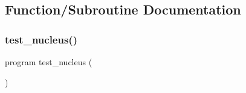 \subsection{Function/\+Subroutine Documentation}
\mbox{\label{table__mod_8f90_a8ebb53a70bcfe3c94dbfbae3e3f52cba}} 
\subsubsection{\texorpdfstring{test\_nucleus()}{test\_nucleus()}}
{\footnotesize\ttfamily program test\+\_\+nucleus (\begin{DoxyParamCaption}{ }\end{DoxyParamCaption})}

